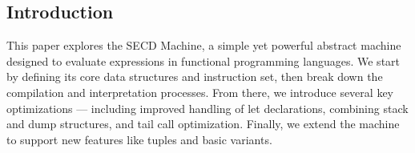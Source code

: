 \begin{multicols}{2}
\tableofcontents
\columnbreak
\section{Introduction}
This paper explores the SECD Machine, a simple yet powerful abstract machine designed to evaluate expressions in functional programming languages. 
We start by defining its core data structures and instruction set, then break down the compilation and interpretation processes. From there, we introduce several key optimizations — including improved handling of let declarations, combining stack and dump structures, and tail call optimization.
Finally, we extend the machine to support new features like tuples and basic variants.
\end{multicols}
